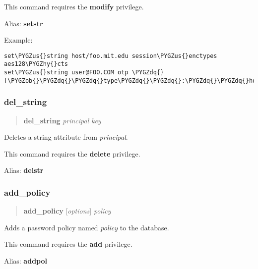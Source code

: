 \documentclass[letterpaper,10pt,english]{sphinxmanual}
\def\PYGZus{\char`\_}
\def\PYGZob{\char`\{}
\def\PYGZcb{\char`\}}
\def\PYGZhy{\char`\-}
\def\PYGZdq{\char`\"}
\begin{document}
This command requires the \textbf{modify} privilege.

Alias: \textbf{setstr}

Example:

\begin{Verbatim}[commandchars=\\\{\}]
set\PYGZus{}string host/foo.mit.edu session\PYGZus{}enctypes aes128\PYGZhy{}cts
set\PYGZus{}string user@FOO.COM otp \PYGZdq{}[\PYGZob{}\PYGZdq{}\PYGZdq{}type\PYGZdq{}\PYGZdq{}:\PYGZdq{}\PYGZdq{}hotp\PYGZdq{}\PYGZdq{},\PYGZdq{}\PYGZdq{}username\PYGZdq{}\PYGZdq{}:\PYGZdq{}\PYGZdq{}al\PYGZdq{}\PYGZdq{}\PYGZcb{}]\PYGZdq{}
\end{Verbatim}
\label{admin/admin_commands/kadmin_local:set-string-end}

\subsubsection{del\_string}
\label{admin/admin_commands/kadmin_local:set-string-end}\label{admin/admin_commands/kadmin_local:del-string}\label{admin/admin_commands/kadmin_local:id11}\begin{quote}

\textbf{del\_string} \emph{principal} \emph{key}
\end{quote}

Deletes a string attribute from \emph{principal}.

This command requires the \textbf{delete} privilege.

Alias: \textbf{delstr}
\label{admin/admin_commands/kadmin_local:del-string-end}

\subsubsection{add\_policy}
\label{admin/admin_commands/kadmin_local:id12}\label{admin/admin_commands/kadmin_local:del-string-end}\label{admin/admin_commands/kadmin_local:add-policy}\begin{quote}

\textbf{add\_policy} {[}\emph{options}{]} \emph{policy}
\end{quote}

Adds a password policy named \emph{policy} to the database.

This command requires the \textbf{add} privilege.

Alias: \textbf{addpol}
\end{document}
